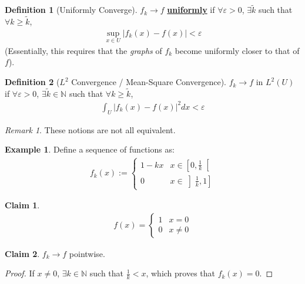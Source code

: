 \documentclass[11pt]{scrartcl}
\theoremstyle{definition}
\newtheorem{definition}{Definition}
\newtheorem{ex}{Example}
\newtheorem{claim}{Claim}
\theoremstyle{remark}
\newtheorem{remark}{Remark}
\newcommand{\dfn}[1]{\textbf{\underline{#1}}}
\newcommand{\idx}[2]{\int_{#1}^{#2}}
\begin{document}
\begin{definition}[Uniformly Converge]
	$f_k \rightarrow f$ \dfn{uniformly} if $\forall \varepsilon > 0$, $\exists \widetilde{k}$ such that $\forall k \geq \widetilde{k}$, 
	\begin{align}
		\sup_{x \in U}|f_k(x) - f(x)| < \varepsilon	
	\end{align}
	(Essentially, this requires that the \emph{graphs} of $f_k$ become uniformly closer to that of $f$).
\end{definition}

\begin{definition}[$L^2$ Convergence / Mean-Square Convergence]
	$f_k \rightarrow f$ in $L^2(U)$ if $\forall \varepsilon > 0$, $\exists \widetilde{k} \in \mathbb{N}$ such that $\forall k \geq \widetilde{k}$, 
	\begin{align}
		\idx{U}{} |f_k(x) - f(x)|^2 dx < \varepsilon	
	\end{align}
\end{definition}

\begin{remark}
	These notions are not all equivalent. 
\end{remark}

\begin{ex}
	Define a sequence of functions as: 
	\begin{align}
		f_k(x) := \begin{cases}
			1 - kx & x \in \left[ 0, \frac{1}{k} \right[ \\
			0 & x \in \left] \frac{1}{k}, 1 \right] 
		\end{cases}	
	\end{align}
\end{ex}

\begin{claim}
	\begin{align}
		f(x) = \begin{cases}
			1 & x =0 \\
			0 & x \neq 0 
		\end{cases}	
	\end{align}
\end{claim}
\begin{claim}
	$f_k \rightarrow f$ pointwise.
\end{claim}

\begin{proof}
	If $x \neq 0$, $\exists k \in \mathbb{N}$ such that $\frac{1}{k} < x$, which proves that $f_k(x) = 0$. 
\end{proof}
\end{document}
